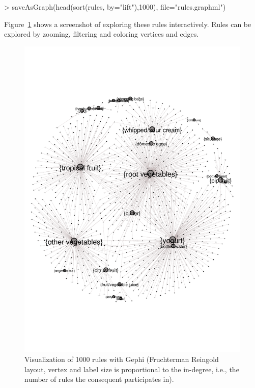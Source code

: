 \documentclass[nojss]{jss}
\begin{document}
\begin{Schunk}
\begin{Sinput}
> saveAsGraph(head(sort(rules, by="lift"),1000), file="rules.graphml")
\end{Sinput}
\end{Schunk}

Figure~\ref{fig:gephi} shows a screenshot of exploring these rules
interactively. Rules can be explored by zooming, filtering and coloring
vertices and edges.

\begin{figure}
\centering
\includegraphics[width=\linewidth]{gephi_1}
\caption{Visualization of 1000 rules with Gephi (Fruchterman Reingold layout, vertex and label size is proportional to the in-degree, i.e., the number of
rules the consequent participates in).
\label{fig:gephi}}
\end{figure}
\end{document}
